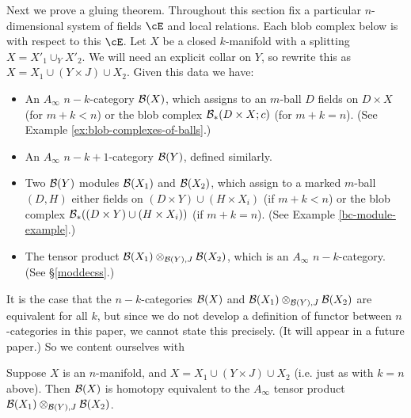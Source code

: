 Next we prove a gluing theorem. Throughout this section fix a particular $n$-dimensional system of fields $\cE$ and local relations. Each blob complex below is  with respect to this $\cE$.
Let $X$ be a closed $k$-manifold with a splitting $X = X'_1\cup_Y X'_2$.
We will need an explicit collar on $Y$, so rewrite this as
$X = X_1\cup (Y\times J) \cup X_2$.
Given this data we have:
\begin{itemize}
\item An $A_\infty$ $n{-}k$-category ${\mathcal B}(X)$, which assigns to an $m$-ball
$D$ fields on $D\times X$ (for $m+k < n$) or the blob complex ${\mathcal B}_*(D\times X; c)$
(for $m+k = n$).
(See Example \ref{ex:blob-complexes-of-balls}.)
\item An $A_\infty$ $n{-}k{+}1$-category ${\mathcal B}(Y)$, defined similarly.
\item Two ${\mathcal B}(Y)$ modules ${\mathcal B}(X_1)$ and ${\mathcal B}(X_2)$, which assign to a marked
$m$-ball $(D, H)$ either fields on $(D\times Y) \cup (H\times X_i)$ (if $m+k < n$)
or the blob complex ${\mathcal B}_*((D\times Y) \cup (H\times X_i))$ (if $m+k = n$).
(See Example \ref{bc-module-example}.)
\item The tensor product ${\mathcal B}(X_1) \otimes_{{\mathcal B}(Y), J} {\mathcal B}(X_2)$, which is
an $A_\infty$ $n{-}k$-category.
(See \S \ref{moddecss}.)
\end{itemize}

It is the case that the $n{-}k$-categories ${\mathcal B}(X)$ and ${\mathcal B}(X_1) \otimes_{{\mathcal B}(Y), J} {\mathcal B}(X_2)$
are equivalent for all $k$, but since we do not develop a definition of functor between $n$-categories
in this paper, we cannot state this precisely.
(It will appear in a future paper.)
So we content ourselves with

\begin{thm}
\label{thm:gluing}
Suppose $X$ is an $n$-manifold, and $X = X_1\cup (Y\times J) \cup X_2$ (i.e. just as with  $k=n$ above). Then ${\mathcal B}(X)$ is homotopy equivalent to the $A_\infty$ tensor product ${\mathcal B}(X_1) \otimes_{{\mathcal B}(Y), J} {\mathcal B}(X_2)$.
\end{thm}

